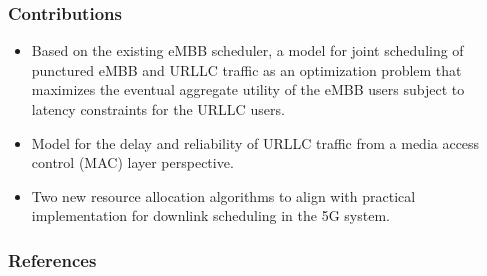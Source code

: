 \documentclass{beamer}
\begin{document}
\begin{frame}
  \frametitle{Contributions}
  \begin{itemize}
    \item Based on the existing eMBB scheduler, a model for joint scheduling of punctured eMBB and URLLC traffic as an optimization problem that maximizes the eventual aggregate utility of the eMBB users subject to latency constraints for the URLLC users.
    \item Model for the delay and reliability of URLLC traffic from a media access control (MAC) layer perspective.
    \item Two new resource allocation algorithms to align with practical implementation for downlink scheduling in the 5G system.
  \end{itemize}
\end{frame}

\begin{frame}
  \frametitle{References}
  \printbibliography[heading=none]
\end{frame}
\end{document}
